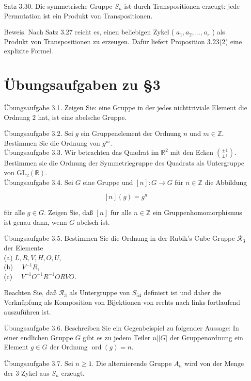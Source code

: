 \documentclass[10pt, letterpaper]{article}
\begin{document}
Satz 3.30. Die symmetrische Gruppe $S_{n}$ ist durch Transpositionen erzeugt: jede Permutation ist ein Produkt von Transpositionen.

Beweis. Nach Satz 3.27 reicht es, einen beliebigen Zykel ( $a_{1}, a_{2}, \ldots, a_{r}$ ) als Produkt von Transpositionen zu erzeugen. Dafür liefert Proposition 3.23(2) eine explizite Formel.

\section*{Übungsaufgaben zu §3}
Übungsaufgabe 3.1. Zeigen Sie: eine Gruppe in der jedes nichttriviale Element die Ordnung 2 hat, ist eine abelsche Gruppe.

Übungsaufgabe 3.2. Sei $g$ ein Gruppenelement der Ordnung $n$ und $m \in \mathbb{Z}$. Bestimmen Sie die Ordnung von $g^{m}$.\\
Übungsaufgabe 3.3. Wir betrachten das Quadrat im $\mathbb{R}^{2}$ mit den Ecken $\binom{ \pm 1}{ \pm 1}$. Bestimmen sie die Ordnung der Symmetriegruppe des Quadrats als Untergruppe von $\mathrm{GL}_{2}(\mathbb{R})$.\\
Übungsaufgabe 3.4. Sei $G$ eine Gruppe und $[n]: G \rightarrow G$ für $n \in \mathbb{Z}$ die Abbildung

$$
[n](g)=g^{n}
$$

für alle $g \in G$. Zeigen Sie, daß $[n]$ für alle $n \in \mathbb{Z}$ ein Gruppenhomomorphismus ist genau dann, wenn $G$ abelsch ist.

Übungsaufgabe 3.5. Bestimmen Sie die Ordnung in der Rubik's Cube Gruppe $\mathscr{R}_{3}$ der Elemente\\
(a) $L, R, V, H, O, U$,\\
(b) $\quad V^{-1} R$,\\
(c) $\quad V^{-1} O^{-1} R^{-1} O R V O$.

Beachten Sie, daß $\mathscr{R}_{3}$ als Untergruppe von $S_{54}$ definiert ist und daher die Verknüpfung als Komposition von Bijektionen von rechts nach links fortlaufend auszuführen ist.

Übungsaufgabe 3.6. Beschreiben Sie ein Gegenbeispiel zu folgender Aussage: In einer endlichen Gruppe $G$ gibt es zu jedem Teiler $n||G|$ der Gruppenordnung ein Element $g \in G$ der Ordnung $\operatorname{ord}(g)=n$.

Übungsaufgabe 3.7. Sei $n \geq 1$. Die alternierende Gruppe $A_{n}$ wird von der Menge der 3-Zykel aus $S_{n}$ erzeugt.
\end{document}
